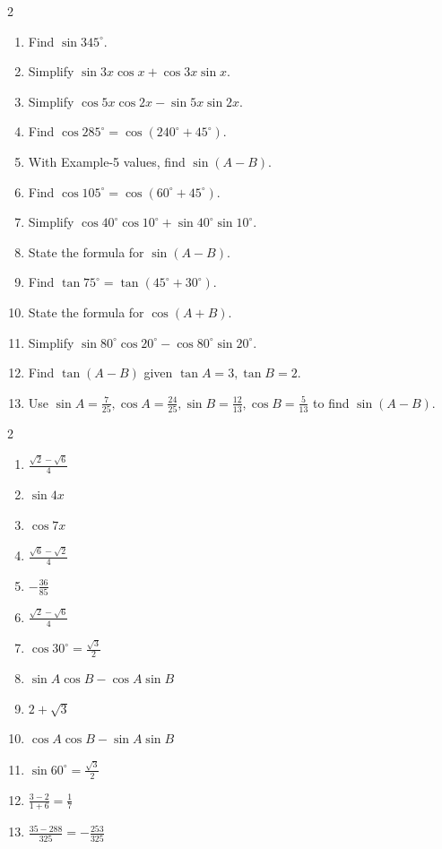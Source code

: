 \documentclass[11pt]{article}
\begin{document}
\clearpage
{}

\begin{recapbox}
\begin{multicols}{2}
\small
\begin{enumerate}[leftmargin=*,itemsep=3pt]
  \item Find $\sin 345^\circ$.
  \item Simplify $\sin 3x\cos x+\cos 3x\sin x$.
  \item Simplify $\cos 5x\cos 2x-\sin 5x\sin 2x$.
  \item Find $\cos 285^\circ=\cos(240^\circ+45^\circ)$.
  \item With Example-5 values, find $\sin(A-B)$.
  \item Find $\cos 105^\circ=\cos(60^\circ+45^\circ)$.
  \item Simplify $\cos40^\circ\cos10^\circ+\sin40^\circ\sin10^\circ$.
  \item State the formula for $\sin(A-B)$.
  \item Find $\tan 75^\circ=\tan(45^\circ+30^\circ)$.
  \item State the formula for $\cos(A+B)$.
  \item Simplify $\sin80^\circ\cos20^\circ-\cos80^\circ\sin20^\circ$.
  \item Find $\tan(A-B)$ given $\tan A=3,\tan B=2$.
  \item Use $\sin A=\tfrac7{25},\cos A=\tfrac{24}{25},\sin B=\tfrac{12}{13},\cos B=\tfrac5{13}$ to find $\sin(A-B)$.
\end{enumerate}
\end{multicols}
\end{recapbox}

\begin{keybox}
\begin{multicols}{2}
\small
\begin{enumerate}[leftmargin=*,itemsep=3pt]
  \item $\tfrac{\sqrt2-\sqrt6}{4}$
  \item $\sin4x$
  \item $\cos7x$
  \item $\tfrac{\sqrt6-\sqrt2}{4}$
  \item $-\tfrac{36}{85}$
  \item $\tfrac{\sqrt2-\sqrt6}{4}$
  \item $\cos30^\circ=\tfrac{\sqrt3}{2}$
  \item $\sin A\cos B-\cos A\sin B$
  \item $2+\sqrt3$
  \item $\cos A\cos B-\sin A\sin B$
  \item $\sin60^\circ=\tfrac{\sqrt3}{2}$
  \item $\tfrac{3-2}{1+6}=\tfrac17$
  \item $\tfrac{35-288}{325}=-\tfrac{253}{325}$
\end{enumerate}
\end{multicols}
\end{keybox}
\end{document}
